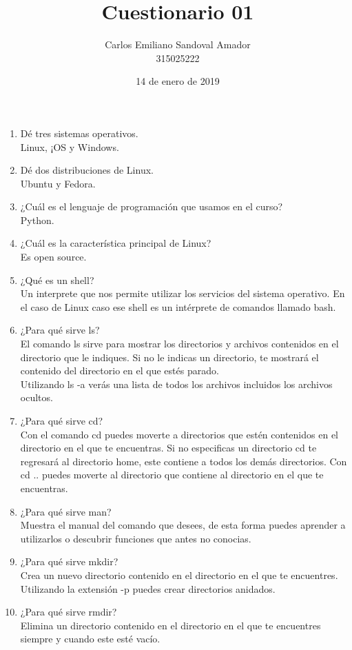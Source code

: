 \documentclass[letterpaper, 12pt, oneside]{article}%
\title{Cuestionario 01}
\author{Carlos Emiliano Sandoval Amador \\ 315025222}
\date{14 de enero de 2019}
\begin{document}
	\maketitle
	\begin{enumerate}
		\item Dé tres sistemas operativos. \\ Linux, ¡OS y Windows.
		\item Dé dos distribuciones de Linux. \\ Ubuntu y Fedora.
		\item ¿Cuál es el lenguaje de programación que usamos en el curso? \\ Python.
		\item ¿Cuál es la característica principal de Linux? \\ Es open source.
		\item ¿Qué es un shell? \\ Un interprete que nos permite utilizar los servicios del sistema operativo. En el caso de Linux caso ese shell es un intérprete de comandos llamado bash.
		\item ¿Para qué sirve ls? \\ El comando ls sirve para mostrar los directorios y archivos contenidos en el directorio que le indiques. Si no le indicas un directorio, te mostrará el contenido del directorio en el que estés parado. \\ Utilizando ls -a verás una lista de todos los archivos incluidos los archivos ocultos.
		\item ¿Para qué sirve cd? \\ Con el comando cd puedes moverte a directorios que estén contenidos en el directorio en el que te encuentras. Si no especificas un directorio cd te regresará al directorio home, este contiene a todos los demás directorios. Con cd .. puedes moverte al directorio que contiene al directorio en el que te encuentras.
		\item ¿Para qué sirve man? \\ Muestra el manual del comando que desees, de esta forma puedes aprender a utilizarlos o descubrir funciones que antes no conocias.
		\item ¿Para qué sirve mkdir? \\ Crea un nuevo directorio contenido en el directorio en el que te encuentres. Utilizando la extensión -p puedes crear directorios anidados.
		\item ¿Para qué sirve rmdir? \\ Elimina un directorio contenido en el directorio en el que te encuentres siempre y cuando este esté vacío.

\end{enumerate}
\end{document}
